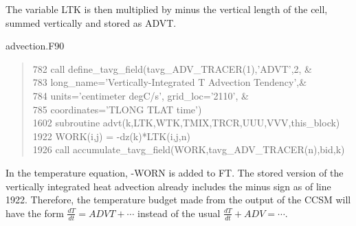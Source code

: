 \begin{appendices}
The variable LTK is then multiplied by minus the vertical length of the cell, summed vertically and stored as ADVT. 
\begin{center} advection.F90 \end{center}
\begin{quotation}
\small
\linespread{0.5}\selectfont\noindent
\phantom{1}782 \hspace{1em} call define\_tavg\_field(tavg\_ADV\_TRACER(1),'ADVT',2,       \&\\
\phantom{1}783 \hspace{1em} long\_name='Vertically-Integrated T Advection Tendency',\&\\
\phantom{1}784 \hspace{1em} units='centimeter degC/s', grid\_loc='2110',      \&\\
\phantom{1}785 \hspace{1em} coordinates='TLONG TLAT time')\\
1602 \hspace{1em} subroutine advt(k,LTK,WTK,TMIX,TRCR,UUU,VVV,this\_block)\\
1922 \hspace{1em} WORK(i,j) = -dz(k)*LTK(i,j,n)\\
1926 \hspace{1em} call accumulate\_tavg\_field(WORK,tavg\_ADV\_TRACER(n),bid,k)
\end{quotation}
In the temperature equation, -WORN is added to FT. The stored version of the vertically integrated heat advection already includes the minus sign as of line 1922. Therefore, the temperature budget made from the output of the CCSM will have the form $\frac{dT}{dt} = ADVT + \cdots$ instead of the usual $\frac{dT}{dt} + ADV = \cdots$.


\end{appendices}

